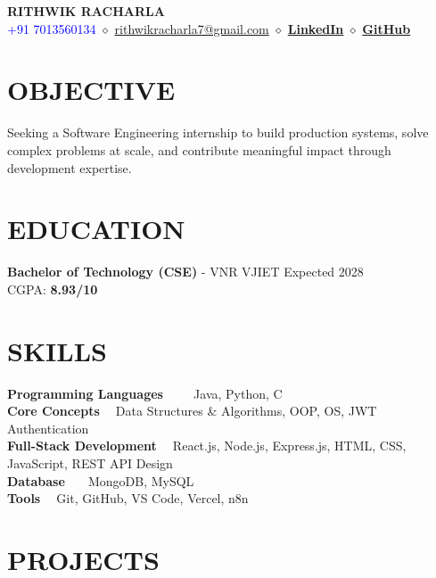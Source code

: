\documentclass[letterpaper,11pt]{article}
\begin{document}
\begin{center}
{\Huge \textbf{RITHWIK RACHARLA}} \\[6pt]
\textcolor{blue}{+91 7013560134} \quad $\diamond$ \quad
\textcolor{blue}{\href{mailto:rithwikracharla7@gmail.com}{rithwikracharla7@gmail.com}} \quad $\diamond$ \quad
\textcolor{blue}{\href{https://www.linkedin.com/in/rithwik-racharla-488064211}{\textbf{LinkedIn}}} \quad $\diamond$ \quad
\textcolor{blue}{\href{https://github.com/Rithwik007}{\textbf{GitHub}}}
\end{center}

\section*{OBJECTIVE}
\noindent Seeking a Software Engineering internship to build production systems, solve complex problems at scale, and contribute meaningful impact through development expertise.

\section*{EDUCATION}
\noindent \textbf{Bachelor of Technology (CSE)} - VNR VJIET \hfill Expected 2028 \\
\noindent CGPA: \textbf{8.93/10}

\section*{SKILLS}
\noindent \textbf{Programming Languages \quad \quad \ \ \ } Java, Python, C \\
\noindent \textbf{Core Concepts \quad \quad \quad \quad \ \quad \quad \quad} Data Structures \& Algorithms, OOP, OS, JWT Authentication \\
\noindent \textbf{Full-Stack Development \quad \quad \quad \ } React.js, Node.js, Express.js, HTML, CSS, JavaScript, REST API Design \\
\noindent \textbf{Database \quad \quad \quad \quad \quad \quad \quad \quad \quad \ \ } MongoDB, MySQL \\
\noindent \textbf{Tools \quad \quad \quad \quad \quad \quad \quad \quad \quad \quad \ \quad } Git, GitHub, VS Code, Vercel, n8n

\section*{PROJECTS}
\end{document}
